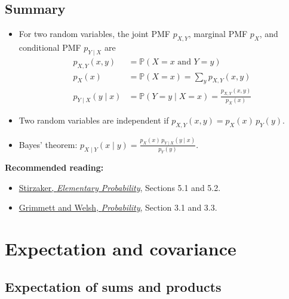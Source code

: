 \documentclass[
  a4paper,
]{book}
\providecommand{\tightlist}{%
  \setlength{\itemsep}{0pt}\setlength{\parskip}{0pt}}
\theoremstyle{definition}
\theoremstyle{definition}
\theoremstyle{definition}
\theoremstyle{definition}
\theoremstyle{remark}
\begin{document}
\hypertarget{summary-L13}{%
\section*{Summary}\label{summary-L13}}

\begin{itemize}
\tightlist
\item
  For two random variables, the joint PMF \(p_{X,Y}\), marginal PMF \(p_X\), and conditional PMF \(p_{Y \mid X}\) are
  \begin{align*}
  p_{X,Y}(x,y) &= \mathbb P(X =x \text{ and } Y = y) \\
  p_X(x) &= \mathbb P(X = x) = \sum_y p_{X,Y}(x,y) \\
  p_{Y \mid X}(y \mid x) &= \mathbb P(Y = y \mid X = x) = \frac{p_{X,Y}(x,y)}{p_X(x)} 
  \end{align*}
\item
  Two random variables are independent if \(p_{X,Y}(x,y) = p_X(x) \, p_Y(y)\).
\item
  Bayes' theorem:
  \({\displaystyle p_{X \mid Y}(x \mid y) = \frac{ p_X(x) \, p_{Y \mid X}(y \mid x)}{p_Y(y)}}\).
\end{itemize}

\textbf{Recommended reading:}

\begin{itemize}
\tightlist
\item
  \href{https://leeds.primo.exlibrisgroup.com/permalink/44LEE_INST/13rlbcs/alma991013131349705181}{Stirzaker, \emph{Elementary Probability}}, Sections 5.1 and 5.2.
\item
  \href{https://leeds.primo.exlibrisgroup.com/permalink/44LEE_INST/13rlbcs/alma991002938669705181}{Grimmett and Welsh, \emph{Probability}}, Section 3.1 and 3.3.
\end{itemize}

\hypertarget{L14-covariance}{%
\chapter{Expectation and covariance}\label{L14-covariance}}

\newcommand{\Cov}{\operatorname{Cov}}
\newcommand{\Corr}{\operatorname{Corr}}

\hypertarget{sum-product}{%
\section{Expectation of sums and products}\label{sum-product}}
\end{document}
